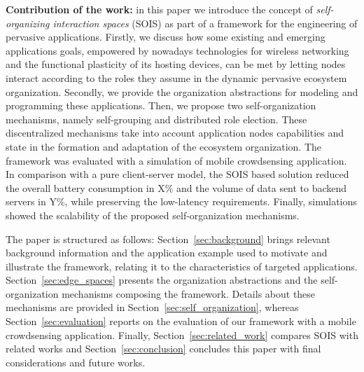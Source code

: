 \textbf{Contribution of the work:} 
in this paper we introduce the concept of \textit{self-organizing interaction spaces} (SOIS) as part of a framework for the engineering of pervasive applications. 
Firstly, we discuss how some existing and emerging applications goals, empowered by nowadays technologies for wireless networking and the functional plasticity of its hosting devices, can be met by letting nodes interact according to the roles they assume in the dynamic pervasive ecosystem organization. 
Secondly, we provide the organization abstractions for modeling and programming these applications. Then, we propose two self-organization mechanisms, namely self-grouping and distributed role election. These discentralized mechanisms take into account application nodes capabilities and state in the formation and adaptation of the ecosystem organization. 
The framework was evaluated with a simulation of mobile crowdsensing application. %
In comparison with a pure client-server model, the SOIS based solution reduced the overall battery consumption in X\% and the volume of data sent to backend servers in Y\%, while preserving the low-latency requirements. Finally, simulations showed the scalability of the proposed self-organization mechanisms.

The paper is structured as follows: Section~\ref{sec:background} brings relevant background information and the application example used to motivate and illustrate the framework, relating it to the characteristics of targeted applications. Section~\ref{sec:edge_spaces} presents the organization abstractions and the self-organization mechanisms composing the framework. Details about these mechanisms are provided in Section~\ref{sec:self_organization}, whereas Section~\ref{sec:evaluation} reports on the evaluation of our framework with a mobile crowdsensing application. Finally, Section~\ref{sec:related_work} compares SOIS with related works and Section~\ref{sec:conclusion} concludes this paper with final considerations and future works.

